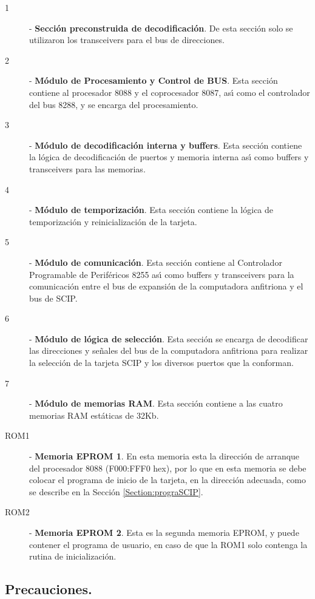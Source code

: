 \begin{description}
\item[1] - {\bf Secci\'on preconstruida de decodificaci\'on}. De esta secci\'on solo se %
utilizaron los transceivers para el bus de direcciones.
\item[2] - {\bf M\'odulo de Procesamiento y Control de BUS}. Esta secci\'on contiene al %
procesador 8088 y el coprocesador 8087, as\'{\i} como el controlador del bus 8288, y se encarga %
del procesamiento.
\item[3] - {\bf M\'odulo de decodificaci\'on interna y buffers}. Esta secci\'on contiene la %
l\'ogica de decodificaci\'on de puertos y memoria interna as\'{\i} como buffers y transceivers %
para las memorias.
\item[4] - {\bf M\'odulo de temporizaci\'on}. Esta secci\'on contiene la l\'ogica de %
temporizaci\'on y reinicializaci\'on de la tarjeta.
\item[5] - {\bf M\'odulo de comunicaci\'on}. Esta secci\'on contiene al Controlador %
Programable de Perif\'ericos 8255 as\'{\i} como buffers y transceivers para la comunicaci\'on %
entre el bus de expansi\'on de la computadora anfitriona y el bus de SCIP.
\item[6] - {\bf M\'odulo de l\'ogica de selecci\'on}. Esta secci\'on se encarga de %
decodificar las direcciones y se\~nales del bus de la computadora anfitriona para realizar la %
selecci\'on de la tarjeta SCIP y los diversos puertos que la conforman.
\item[7] - {\bf M\'odulo de memorias RAM}. Esta secci\'on contiene a las cuatro memorias RAM %
est\'aticas de 32Kb.
\item[ROM1] - {\bf Memoria EPROM 1}. En esta memoria esta la direcci\'on de arranque del %
procesador 8088 (F000:FFF0 hex), por lo que en esta memoria se debe colocar el programa de %
inicio de la tarjeta, en la direcci\'on adecuada, como se describe en la Secci\'on %
\ref{Section:prograSCIP}.
\item[ROM2] - {\bf Memoria EPROM 2}. Esta es la segunda memoria EPROM, y puede contener el %
programa de usuario, en caso de que la ROM1 solo contenga la rutina de inicializaci\'on.
\end{description}


\subsection{Precauciones.}
\label{Subsection:precauciones}

